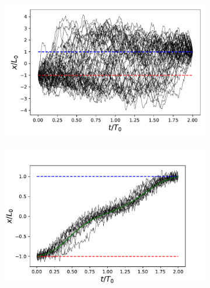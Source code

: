 \begin{figure} 
    \centering
     
    \begin{subfigure}[b]{0.31\textwidth}  
        \centering 
        \includegraphics[width=\textwidth]{figs_part1/mcmc/1D_process_trajectories}
        \caption[]%
        {}    
    \end{subfigure}
    \hfill
    \begin{subfigure}[b]{0.33\textwidth}
        \centering
        \includegraphics[width=\textwidth]{figs_part1/mcmc/1D_process_cold_trajectories}
        \caption[]%
        {}    
    \end{subfigure}    
    \hfill
    \begin{subfigure}[b]{0.314\textwidth}
        \centering

\end{subfigure}
\end{figure}
